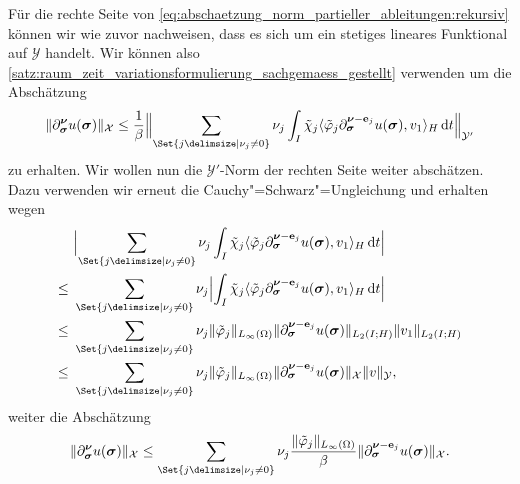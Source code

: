 \documentclass[../main.tex]{subfiles}
\begin{document}
\begin{Satz}
\begin{Beweis}
        Für die rechte Seite von \cref{eq:abschaetzung_norm_partieller_ableitungen:rekursiv} können wir wie zuvor nachweisen, dass es sich um ein stetiges lineares Funktional auf $\mathcal Y$ handelt.
        Wir können also \cref{satz:raum_zeit_variationsformulierung_sachgemaess_gestellt} verwenden um die Abschätzung
        \begin{equation}
            \norm{\partial^{\bm\nu}_{\bm\sigma} u(\bm\sigma)}_{\mathcal X} \leq \frac{1}{\beta} \norm[\Big]{\sum_{\Set{j \given \nu_{j} \neq 0}} \nu_{j} \int_{I} \tilde{\chi}_{j} \skp{\tilde{\varphi}_{j} \partial^{\bm\nu - \vec e_{j}}_{\bm\sigma} u(\bm\sigma)}{v_{1}}{H} \diff t}_{\mathcal Y'}
        \end{equation}
        zu erhalten.
        Wir wollen nun die $\mathcal Y'$-Norm der rechten Seite weiter abschätzen.
        Dazu verwenden wir erneut die Cauchy"=Schwarz"=Ungleichung und erhalten wegen
        \begin{align}
            &\abs[\Big]{\sum_{\Set{j \given \nu_{j} \neq 0}} \nu_{j} \int_{I} \tilde{\chi}_{j} \skp{\tilde{\varphi}_{j} \partial^{\bm\nu - \vec e_{j}}_{\bm\sigma} u(\bm\sigma)}{v_{1}}{H} \diff t}
            \\\leq~
            &\sum_{\Set{j \given \nu_{j} \neq 0}} \nu_{j} \abs[\Big]{\int_{I} \tilde{\chi}_{j} \skp{\tilde{\varphi}_{j} \partial^{\bm\nu - \vec e_{j}}_{\bm\sigma} u(\bm\sigma)}{v_{1}}{H} \diff t}
            \\\leq~
            &\sum_{\Set{j \given \nu_{j} \neq 0}} \nu_{j} \norm{\tilde{\varphi}_{j}}_{L_{\infty}(\Omega)} \norm{\partial^{\bm\nu - \vec e_{j}}_{\bm\sigma} u(\bm\sigma)}_{L_{2}(I; H)} \norm{v_{1}}_{L_{2}(I; H)}
            \\\leq~
            &\sum_{\Set{j \given \nu_{j} \neq 0}} \nu_{j} \norm{\tilde{\varphi}_{j}}_{L_{\infty}(\Omega)} \norm{\partial^{\bm\nu - \vec e_{j}}_{\bm\sigma} u(\bm\sigma)}_{\mathcal X} \norm{v}_{\mathcal Y},
        \end{align}
        weiter die Abschätzung
        \begin{equation}
            \label{eq:abschaetzung_norm_partieller_ableitungen:rekursive_schranke}
            \norm{\partial^{\bm\nu}_{\bm\sigma} u(\bm\sigma)}_{\mathcal X} \leq \sum_{\Set{j \given \nu_{j} \neq 0}} \nu_{j} \frac{\norm{\tilde{\varphi}_{j}}_{L_{\infty}(\Omega)}}{\beta} \norm{\partial^{\bm\nu - \vec e_{j}}_{\bm\sigma} u(\bm\sigma)}_{\mathcal X}.
        \end{equation}


\end{Beweis}
\end{Satz}
\end{document}
